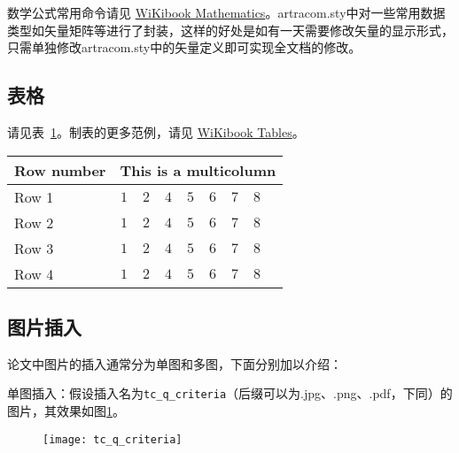 数学公式常用命令请见 \href{https://en.wikibooks.org/wiki/LaTeX/Mathematics}{WiKibook Mathematics}。artracom.sty中对一些常用数据类型如矢量矩阵等进行了封装，这样的好处是如有一天需要修改矢量的显示形式，只需单独修改artracom.sty中的矢量定义即可实现全文档的修改。

\subsection{表格}

请见表~\ref{tab:sample}。制表的更多范例，请见 \href{https://en.wikibooks.org/wiki/LaTeX/Tables}{WiKibook Tables}。
\begin{table}[!htbp]
    \label{tab:sample}
    \centering
    \footnotesize%
    \setlength{\tabcolsep}{4pt}%
    \renewcommand{\arraystretch}{1.2}%
    \begin{tabular}{lcccccccc}
        \hline
        Row number & \multicolumn{8}{c}{This is a multicolumn} \\
        \hline
        Row 1 & $1$ & $2$ & $4$ & $5$ & $6$ & $7$ & $8$\\
        Row 2 & $1$ & $2$ & $4$ & $5$ & $6$ & $7$ & $8$\\
        Row 3 & $1$ & $2$ & $4$ & $5$ & $6$ & $7$ & $8$\\
        Row 4 & $1$ & $2$ & $4$ & $5$ & $6$ & $7$ & $8$\\
        \hline
    \end{tabular}
\end{table}

\subsection{图片插入}

论文中图片的插入通常分为单图和多图，下面分别加以介绍：

单图插入：假设插入名为\verb|tc_q_criteria|（后缀可以为.jpg、.png、.pdf，下同）的图片，其效果如图\ref{fig:tc_q_criteria}。
\begin{figure}[!htbp]
    \centering
    \texttt{[image: tc\_q\_criteria]}
    \label{fig:tc_q_criteria}
\end{figure}


